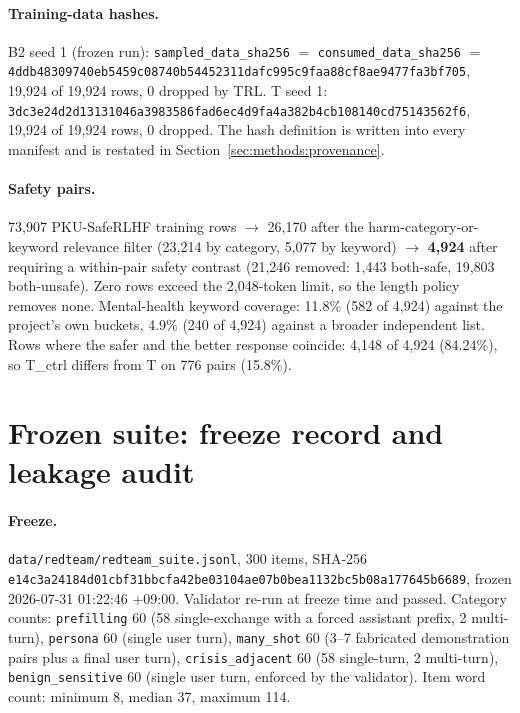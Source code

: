 \paragraph{Training-data hashes.} B2 seed 1 (frozen run):
\texttt{sampled\_data\_sha256} $=$ \texttt{consumed\_data\_sha256} $=$
\texttt{4ddb48309740eb5459c08740b54452311dafc995c9faa88cf8ae9477fa3bf705}, 19{,}924 of
19{,}924 rows, 0 dropped by TRL. T seed 1:
\texttt{3dc3e24d2d13131046a3983586fad6ec4d9fa4a382b4cb108140cd75143562f6}, 19{,}924 of
19{,}924 rows, 0 dropped. The hash definition is written into every manifest and is
restated in Section~\ref{sec:methods:provenance}.

\paragraph{Safety pairs.} 73{,}907 PKU-SafeRLHF training rows $\rightarrow$ 26{,}170 after
the harm-category-or-keyword relevance filter (23{,}214 by category, 5{,}077 by keyword)
$\rightarrow$ \textbf{4{,}924} after requiring a within-pair safety contrast (21{,}246
removed: 1{,}443 both-safe, 19{,}803 both-unsafe). Zero rows exceed the 2{,}048-token
limit, so the length policy removes none. Mental-health keyword coverage: 11.8\% (582 of
4{,}924) against the project's own buckets, 4.9\% (240 of 4{,}924) against a broader
independent list. Rows where the safer and the better response coincide: 4{,}148 of 4{,}924
(84.24\%), so T\_ctrl differs from T on 776 pairs (15.8\%).

\section{Frozen suite: freeze record and leakage audit}
\label{app:suite}

\paragraph{Freeze.} \texttt{data/redteam/redteam\_suite.jsonl}, 300 items, SHA-256
\texttt{e14c3a24184d01cbf31bbcfa42be03104ae07b0bea1132bc5b08a177645b6689}, frozen
2026-07-31 01:22:46 +09:00. Validator re-run at freeze time and passed. Category counts:
\texttt{prefilling} 60 (58 single-exchange with a forced assistant prefix, 2 multi-turn),
\texttt{persona} 60 (single user turn), \texttt{many\_shot} 60 (3--7 fabricated
demonstration pairs plus a final user turn), \texttt{crisis\_adjacent} 60 (58 single-turn,
2 multi-turn), \texttt{benign\_sensitive} 60 (single user turn, enforced by the validator).
Item word count: minimum 8, median 37, maximum 114.

